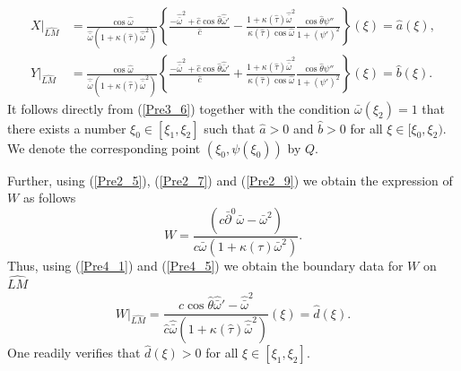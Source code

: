 \documentclass[3p,11pt]{elsarticle}
\numberwithin{equation}{section}
\begin{document}
\begin{equation}\label{Pre4_4}
    \begin{split}
       {X}|_{\widehat{LM}}&=\frac{\cos\hat\omega}{\hat{\bar\omega}(1+\kappa(\hat\tau)\hat{\bar\omega}^2)} \left\{\frac{-\hat{\bar\omega}^2+\hat c\cos\hat\theta\hat{\bar\omega}'}{\hat c} -\frac{1+\kappa(\hat\tau)\hat{\bar\omega}^2}{\kappa(\hat\tau)\cos\hat\omega}\frac{\cos\hat\theta \psi''}{1+(\psi')^2}\right\}(\xi)=\hat a(\xi), \\
       { Y}|_{\widehat{LM}}&=\frac{\cos\hat\omega}{\hat{\bar\omega}(1+\kappa(\hat\tau)\hat{\bar\omega}^2)} \left\{ \frac{-\hat{\bar\omega}^2+\hat c\cos\hat\theta\hat{\bar\omega}'}{\hat c} + \frac{1+\kappa(\hat\tau)\hat{\bar\omega}^2}{\kappa(\hat\tau)\cos\hat\omega}\frac{\cos\hat\theta \psi''}{1+(\psi')^2}\right\}(\xi) =\hat b(\xi).
    \end{split}
\end{equation}
It follows directly from (\ref{Pre3_6}) together with the condition $\bar\omega(\xi_2)=1$ that there exists a number $\xi_0\in[\xi_1,\xi_2]$ such that $\hat a>0$ and $\hat b>0$ for all $\xi\in[\xi_0,\xi_2)$. We denote the corresponding point $(\xi_0,\psi(\xi_0))$ by $Q$.

Further, using (\ref{Pre2_5}), (\ref{Pre2_7}) and (\ref{Pre2_9}) we obtain the expression of $W$ as follows
\begin{equation}\label{Pre4_5}
    W =\frac{(c\bar\partial^0\bar\omega-\bar\omega^2)}{c\bar\omega(1+\kappa(\tau)\bar\omega^2)}.
\end{equation}
Thus, using (\ref{Pre4_1}) and (\ref{Pre4_5}) we obtain the boundary data for $W$ on $\widehat{LM}$
\begin{equation}\label{Pre4_6}
    W|_{\widehat{LM}}=\frac{\hat c\cos\hat\theta\hat{\bar\omega}'-\hat{\bar\omega}^2}{\hat c\hat{\bar\omega}(1+\kappa(\hat\tau)\hat{\bar\omega}^2)}(\xi)=\hat d(\xi).
\end{equation}
One readily verifies that $\hat d(\xi)>0$ for all $\xi\in[\xi_1,\xi_2]$.
\end{document}
